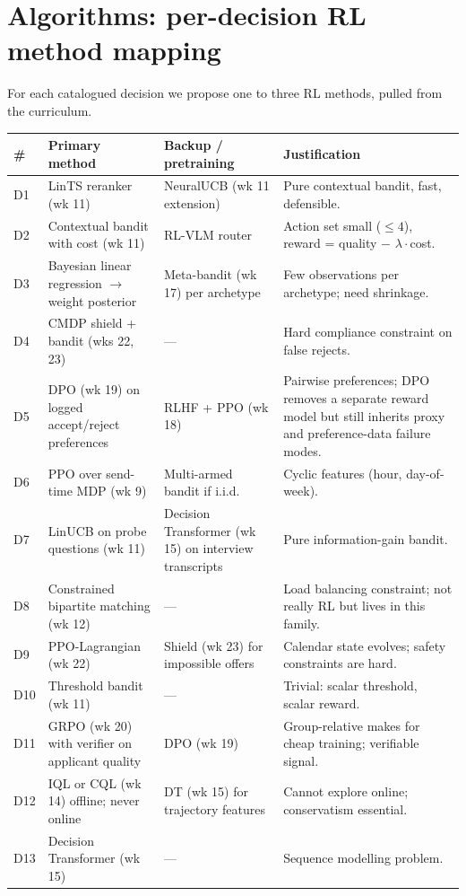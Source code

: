 \documentclass[11pt,oneside]{scrbook}
\begin{document}
\chapter{Algorithms: per-decision RL method mapping}

For each catalogued decision we propose one to three RL methods, pulled
from the curriculum.

\begin{table}[h]
\centering\small
\begin{tabular}{p{0.7cm} p{3.8cm} p{3.6cm} p{4.4cm}}
\toprule
\# & Primary method & Backup / pretraining & Justification \\
\midrule
D1 & LinTS reranker (wk 11) & NeuralUCB (wk 11 extension) & Pure contextual bandit, fast, defensible. \\
D2 & Contextual bandit with cost (wk 11) & RL-VLM router & Action set small ($\le 4$), reward = quality $-$ $\lambda\cdot$cost. \\
D3 & Bayesian linear regression $\to$ weight posterior & Meta-bandit (wk 17) per archetype & Few observations per archetype; need shrinkage. \\
D4 & CMDP shield + bandit (wks 22, 23) & --- & Hard compliance constraint on false rejects. \\
D5 & DPO (wk 19) on logged accept/reject preferences & RLHF + PPO (wk 18) & Pairwise preferences; DPO removes a separate reward model but still inherits proxy and preference-data failure modes. \\
D6 & PPO over send-time MDP (wk 9) & Multi-armed bandit if i.i.d. & Cyclic features (hour, day-of-week). \\
D7 & LinUCB on probe questions (wk 11) & Decision Transformer (wk 15) on interview transcripts & Pure information-gain bandit. \\
D8 & Constrained bipartite matching (wk 12) & --- & Load balancing constraint; not really RL but lives in this family. \\
D9 & PPO-Lagrangian (wk 22) & Shield (wk 23) for impossible offers & Calendar state evolves; safety constraints are hard. \\
D10 & Threshold bandit (wk 11) & --- & Trivial: scalar threshold, scalar reward. \\
D11 & GRPO (wk 20) with verifier on applicant quality & DPO (wk 19) & Group-relative makes for cheap training; verifiable signal. \\
D12 & IQL or CQL (wk 14) offline; never online & DT (wk 15) for trajectory features & Cannot explore online; conservatism essential. \\
D13 & Decision Transformer (wk 15) & --- & Sequence modelling problem. \\
\bottomrule
\end{tabular}
\end{table}
\end{document}
